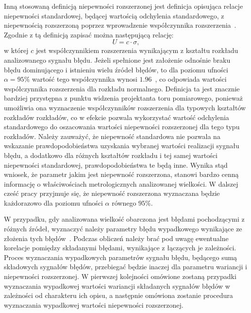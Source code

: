 Inną stosowaną definicją niepewności rozszerzonej jest definicja opisująca relacje niepewności standardowej, będącej wartością odchylenia standardowego, z niepewnością rozszerzoną poprzez wprowadzenie współczynnika rozszerzenia~\cite{jcgm_guide}. Zgodnie z tą definicją zapisać można następującą relację:
\begin{equation}
U = c \cdot \sigma \label{eq:unc_sum},
\end{equation}
w której $c$ jest współczynnikiem rozszerzenia wynikającym z kształtu rozkładu analizowanego sygnału błędu. Jeżeli spełnione jest założenie odnośnie braku błędu dominującego i istnieniu wielu źródeł błędów, to dla poziomu ufności $\alpha = 95\%$ wartość tego współczynnika wynosi $1.96$~\cite{jcgm_guide}, co odpowiada wartości współczynnika rozszerzenia dla rozkładu normalnego. Definicja ta jest znacznie bardziej przystępna z punktu widzenia projektanta toru pomiarowego, ponieważ umożliwia ona wyznaczenie współczynników rozszerzenia dla typowych kształtów rozkładów rozkładów, co w efekcie pozwala wykorzystać wartość odchylenia standardowego do oszacowania wartości niepewności rozszerzonej dla tego typu rozkładów. Należy zauważyć, że niepewność standardowa nie pozwala na wskazanie prawdopodobieństwa uzyskania wybranej wartości realizacji sygnału błędu, a dodatkowo dla różnych kształtów rozkładu i tej samej wartości niepewności standardowej, prawdopodobieństwa te będą inne. Wynika stąd wniosek, że parametr jakim jest niepewność rozszerzona, stanowi bardzo cenną informację o właściwościach metrologicznych analizowanej wielkości. W dalszej cześć pracy przyjmuje się, że niepewność rozszerzona wyznaczana będzie każdorazowo dla poziomu ufności $\alpha$ równego $95\%$.

W przypadku, gdy analizowana wielkość obarczona jest błędami pochodzącymi z różnych źródeł, wyznaczyć należy parametry błędu wypadkowego wynikające ze złożenia tych błędów~\cite{wymyslo_range}. Podczas obliczeń należy brać pod uwagę ewentualne korelacje pomiędzy składanymi błędami, wynikające z łączących je zależności. Proces wyznaczania wypadkowych parametrów sygnału błędu, będącego sumą składowych sygnałów błędów, przebiegać będzie inaczej dla parametru wariancji i niepewności rozszerzonej. W pierwszej kolejności omówione zostaną przypadki wyznaczania wypadkowej wartości wariancji składanych sygnałów błędów w zależności od charakteru ich opisu, a następnie omówiona zostanie procedura wyznaczania wypadkowej wartości niepewności rozszerzonej.

